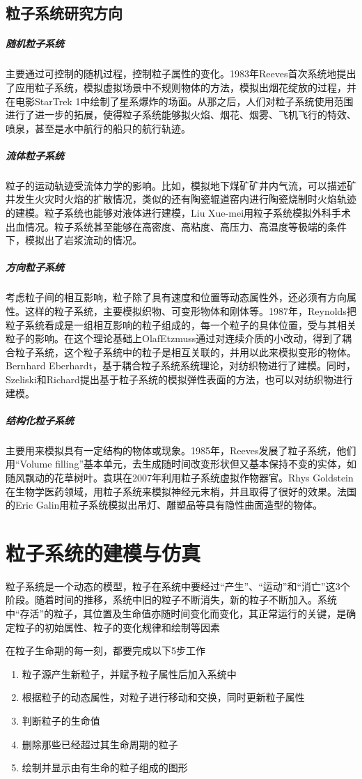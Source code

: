 \documentclass[UTF8,a4paper,14pt]{ctexart}
\begin{document}
	\subsection{粒子系统研究方向}
		\subparagraph{随机粒子系统}
			主要通过可控制的随机过程，控制粒子属性的变化。1983年Reeves首次系统地提出了应用粒子系统，模拟虚拟场景中不规则物体的方法，模拟出烟花绽放的过程，并在电影StarTrek 1中绘制了星系爆炸的场面。从那之后，人们对粒子系统使用范围进行了进一步的拓展，使得粒子系统能够拟火焰、烟花、烟雾、飞机飞行的特效、喷泉，甚至是水中航行的船只的航行轨迹。
		
		\subparagraph{流体粒子系统}
			粒子的运动轨迹受流体力学的影响。比如，模拟地下煤矿矿井内气流，可以描述矿井发生火灾时火焰的扩散情况，类似的还有陶瓷辊道窑内进行陶瓷烧制时火焰轨迹的建模。粒子系统也能够对液体进行建模，Liu Xue-mei用粒子系统模拟外科手术出血情况。粒子系统甚至能够在高密度、高粘度、高压力、高温度等极端的条件下，模拟出了岩浆流动的情况。
			
		\subparagraph{方向粒子系统}
			考虑粒子间的相互影响，粒子除了具有速度和位置等动态属性外，还必须有方向属性。这样的粒子系统，主要模拟织物、可变形物体和刚体等。1987年，Reynolds把粒子系统看成是一组相互影响的粒子组成的，每一个粒子的具体位置，受与其相关粒子的影响。在这个理论基础上OlafEtzmuss通过对连续介质的小改动，得到了耦合粒子系统，这个粒子系统中的粒子是相互关联的，并用以此来模拟变形的物体。Bernhard Eberhardt，基于耦合粒子系统系统理论，对纺织物进行了建模。同时，Szeliski和Richard提出基于粒子系统的模拟弹性表面的方法，也可以对纺织物进行建模。
			
		\subparagraph{结构化粒子系统}
			主要用来模拟具有一定结构的物体或现象。1985年，Reeves发展了粒子系统，他们用“Volume filling”基本单元，去生成随时间改变形状但又基本保持不变的实体，如随风飘动的花草树叶。袁琪在2007年利用粒子系统虚拟作物器官。Rhys Goldstein在生物学医药领域，用粒子系统来模拟神经元末梢，并且取得了很好的效果。法国的Eric Galin用粒子系统模拟出吊灯、雕塑品等具有隐性曲面造型的物体。


\newpage
\section{粒子系统的建模与仿真}
	粒子系统是一个动态的模型，粒子在系统中要经过“产生”、“运动”和“消亡”这3个阶段。随着时间的推移，系统中旧的粒子不断消失，新的粒子不断加入。系统中“存活”的粒子，其位置及生命值亦随时间变化而变化，其正常运行的关键，是确定粒子的初始属性、粒子的变化规律和绘制等因素
	
	在粒子生命期的每一刻，都要完成以下5步工作
	\begin{enumerate}[fullwidth,itemindent = 2em]
		\item 粒子源产生新粒子，并赋予粒子属性后加入系统中
		\item 根据粒子的动态属性，对粒子进行移动和交换，同时更新粒子属性 
		\item 判断粒子的生命值
		\item 删除那些已经超过其生命周期的粒子
		\item 绘制并显示由有生命的粒子组成的图形
	\end{enumerate}
	
\end{document}

